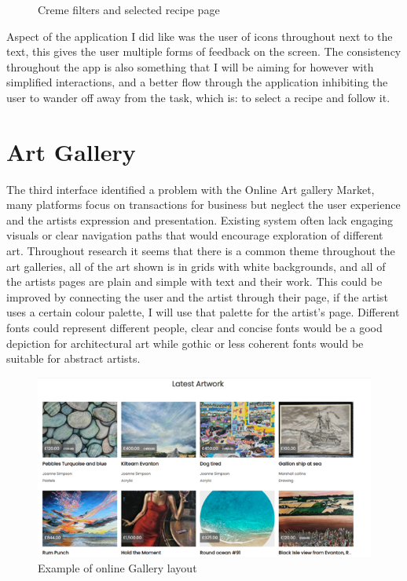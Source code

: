\documentclass[]{project_interim}
\begin{document}
\begin{figure}[ht!]
\begin{minipage}[t]{0.4\textwidth}
  \end{minipage}
  \caption{Creme filters and selected recipe page}
  \label{fig:1}
\end{figure}

Aspect of the application I did like was the user of icons throughout next to the text, this gives the user multiple forms of feedback on the screen. The consistency throughout the app is also something that I will be aiming for however with simplified interactions, and a better flow through the application inhibiting the user to wander off away from the task, which is: to select a recipe and follow it.

\section{Art Gallery}

The third interface identified a problem with the Online Art gallery Market, many platforms focus on transactions for business but neglect the user experience and the artists expression and presentation. Existing system often lack engaging visuals or clear navigation paths that would encourage exploration of different art.
Throughout research it seems that there is a common theme throughout the art galleries, all of the art shown is in grids with white backgrounds, and all of the artists pages are plain and simple with text and their work. This could be improved by connecting the user and the artist through their page, if the artist uses a certain colour palette, I will use that palette for the artist’s page. Different fonts could represent different people, clear and concise fonts would be a good depiction for architectural art while gothic or less coherent fonts would be suitable for abstract artists.

\begin{figure}[ht!]
  \centering
  \includegraphics{artGalleryGrid.png}
  \vspace*{0.0cm}
  \caption{Example of online Gallery layout}
  \label{fig:1}
\end{figure}
\end{document}
